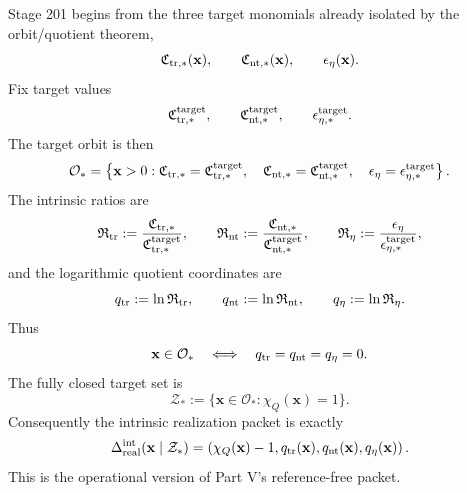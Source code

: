 Stage 201 begins from the three target monomials already isolated by the orbit/quotient theorem,
\begin{equation}
\label{eq:app-part06-target-monomials}
\mathfrak C_{{\rm tr},*}(\mathbf x),
\qquad
\mathfrak C_{{\rm nt},*}(\mathbf x),
\qquad
\epsilon_\eta(\mathbf x).
\end{equation}
Fix target values
\begin{equation}
\label{eq:app-part06-target-values}
\mathfrak C_{{\rm tr},*}^{\rm target},
\qquad
\mathfrak C_{{\rm nt},*}^{\rm target},
\qquad
\epsilon_{\eta,*}^{\rm target}.
\end{equation}
The target orbit is then
\begin{equation}
\label{eq:app-part06-target-orbit-def}
\mathcal O_*
=
\left\{
\mathbf x>0:
\mathfrak C_{{\rm tr},*}=\mathfrak C_{{\rm tr},*}^{\rm target},
\quad
\mathfrak C_{{\rm nt},*}=\mathfrak C_{{\rm nt},*}^{\rm target},
\quad
\epsilon_\eta=\epsilon_{\eta,*}^{\rm target}
\right\}.
\end{equation}
The intrinsic ratios are
\begin{equation}
\label{eq:app-part06-intrinsic-ratios}
\mathfrak R_{\rm tr}:=\frac{\mathfrak C_{{\rm tr},*}}{\mathfrak C_{{\rm tr},*}^{\rm target}},
\qquad
\mathfrak R_{\rm nt}:=\frac{\mathfrak C_{{\rm nt},*}}{\mathfrak C_{{\rm nt},*}^{\rm target}},
\qquad
\mathfrak R_\eta:=\frac{\epsilon_\eta}{\epsilon_{\eta,*}^{\rm target}},
\end{equation}
and the logarithmic quotient coordinates are
\begin{equation}
\label{eq:app-part06-q-defs}
q_{\rm tr}:=\ln\mathfrak R_{\rm tr},
\qquad
q_{\rm nt}:=\ln\mathfrak R_{\rm nt},
\qquad
q_\eta:=\ln\mathfrak R_\eta.
\end{equation}
Thus
\begin{equation}
\label{eq:app-part06-target-orbit-iff}
\mathbf x\in\mathcal O_*
\quad\Longleftrightarrow\quad
q_{\rm tr}=q_{\rm nt}=q_\eta=0.
\end{equation}
The fully closed target set is
\begin{equation}
\label{eq:app-part06-Zstar-def}
\mathcal Z_*:=\{\mathbf x\in\mathcal O_*:\chi_Q(\mathbf x)=1\}.
\end{equation}
Consequently the intrinsic realization packet is exactly
\begin{equation}
\label{eq:app-part06-intrinsic-realization-packet}
\Delta_{\rm real}^{\rm int}(\mathbf x\mid\mathcal Z_*)
=
\left(
\chi_Q(\mathbf x)-1,
q_{\rm tr}(\mathbf x),
q_{\rm nt}(\mathbf x),
q_\eta(\mathbf x)
\right).
\end{equation}
This is the operational version of Part V's reference-free packet.

